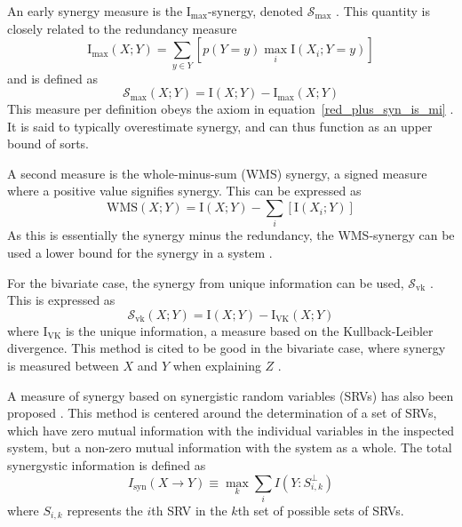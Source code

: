 \documentclass[../main.tex]{subfiles}
\begin{document}
An early synergy measure is the $\mathrm{I}_\mathrm{max}$-synergy, denoted $\mathcal{S}_\mathrm{max}$ \cite{williams2010nonnegative}.
This quantity is closely related to the redundancy measure
%
\begin{equation}
\mathrm{I}_\mathrm{max} (X; Y) = \sum_{y \in Y} [ p(Y = y) \max_i \mathrm{I} (X_i ; Y = y) ]
\end{equation}
%
and is defined as 
%
\begin{equation}
\mathcal{S}_\mathrm{max} (X;Y) = \mathrm{I}(X;Y) - \mathrm{I}_\mathrm{max} (X;Y)
\end{equation}
%
This measure per definition obeys the axiom in equation~\ref{red_plus_syn_is_mi} \cite{griffith2014quantifying}.
It is said to typically overestimate synergy, and can thus function as an upper bound of sorts.

A second measure is the whole-minus-sum (WMS) synergy, a signed measure where a positive value
signifies synergy.
This can be expressed as
%
\begin{equation}
\mathrm{WMS}(X;Y) = \mathrm{I}(X;Y) - \sum_i [\mathrm{I}(X_i;Y)]
\label{WMS}
\end{equation}
%
As this is essentially the synergy minus the redundancy, the WMS-synergy can be used a lower bound for the synergy in a system \cite{griffith2014quantifying, olbrich2015information}.

For the bivariate case, the synergy from unique information can be used, $\mathcal{S}_\mathrm{vk}$ \cite{bertschinger2014quantifying, griffith2014quantifying, olbrich2015information}.
This is expressed as
\begin{equation}
\mathcal{S}_\mathrm{vk} (X;Y) = \mathrm{I}(X;Y) - \mathrm{I}_\mathrm{VK} (X;Y)
\end{equation}
%
where $\mathrm{I}_\mathrm{VK}$ is the unique information, a measure based on the Kullback-Leibler divergence.
This method is cited to be good in the bivariate case, where synergy is measured between $X$ and $Y$ when explaining $Z$ \cite{olbrich2015information}.

A measure of synergy based on synergistic random variables (SRVs) has also been proposed \cite{quax2017quantifying}.
This method is centered around the determination of a set of SRVs, which have zero mutual information with the individual variables in the inspected system, but a non-zero mutual information with the system as a whole.
The total synergystic information is defined as
\begin{equation}
\label{SRV}
I_\mathrm{syn}(X \rightarrow Y) \equiv \max_k \sum_i I(Y : S_{i,k}^\perp)
\end{equation}
where $S_{i,k}$ represents the $i$th SRV in the $k$th set of possible sets of SRVs.
\end{document}
